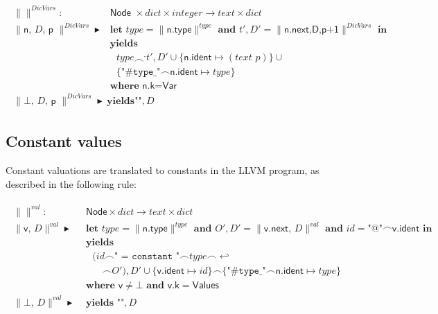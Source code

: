 \documentclass{article}
\newcommand{\trad}[2]{\ensuremath{\lVert \textsf{#1} \rVert^{\textit{#2}}}}
\newcommand{\nl}[0]{\ensuremath{\hookleftarrow}}
\DeclareMathOperator{\conc}{\smallfrown}
\DeclareMathOperator{\isdef}{\blacktriangleright}
\begin{document}
\begin{framed}
\begin{align}
\begin{split}
  \trad{}{DicVars} : & \textsf{ Node } \times dict \times integer \rightarrow text  \times dict \\
  \trad{n, $D$, p }{DicVars} \isdef  & \textbf{ let }   type = \trad{n.type}{type}   \textbf{ and }  t', D' =  \trad{n.next,D,p+1} {DicVars}   \textbf{ in}   \\
  & \textbf{ yields } \\
  & \quad  type \conc^,  t' , D' \cup \{ \textsf{n.ident} \mapsto (\textit{text }  p) \}  \cup\\
  & \quad \{ \texttt{"\#type\_"}\conc \textsf{n.ident} \mapsto type \} \\
  & \textbf{ where } \textsf{n.k} = \textsf{Var}  \\
\trad{$\bot$, $D$, p }{DicVars} \isdef & \textbf{yields} \texttt{""}, D
\end{split}
\end{align}
\end{framed}

\subsection{Constant values}
\label{sec:values}

Constant valuations are translated to constants in the
LLVM program, as described in the following rule:
\begin{framed}
\begin{align}
\begin{split}
  \trad{}{val} : & \textsf{ Node} \times dict \rightarrow text \times dict \\
  \trad{v, $D$}{val} \isdef & \textbf{ let } type = \trad{n.type}{type}   \textbf{ and }O', D' = \trad{v.next, $D$}{val} \textbf{ and } 
  id = \texttt{"@"} \conc \textsf{v.ident} \textbf{ in} \\
  & \textbf{ yields } \\
  & \quad (id \conc \texttt{" = constant "} \conc type \conc \nl \\
  & \quad \quad \conc O'), D' \cup \{ \textsf{v.ident} \mapsto id \} \conc  \{ \texttt{"\#type\_"}\conc \textsf{n.ident} \mapsto type \} \\
  & \textbf{ where } \textsf{v} \ne \bot \textbf{ and } \textsf{v.k} = \textsf{Values} \\
  \trad{$\bot$, $D$}{val} \isdef & \textbf{ yields } \texttt{""}, D
\end{split}
\end{align}
\end{framed}
\end{document}
